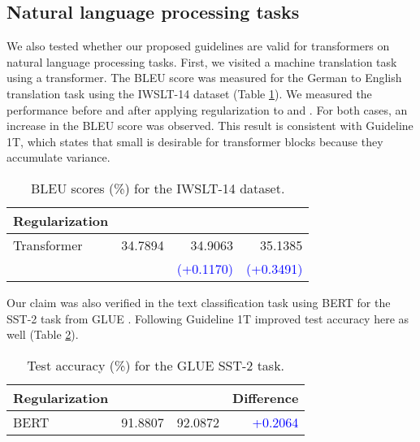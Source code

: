 \documentclass{article}
\begin{document}
\subsection{Natural language processing tasks}
We also tested whether our proposed guidelines are valid for transformers on natural language processing tasks. First, we visited a machine translation task using a transformer. The BLEU score \cite{acl/PapineniRWZ02} was measured for the German to English translation task using the IWSLT-14 dataset \cite{cettolo2014report} (Table \ref{tab:iwslt}). We measured the performance before and after applying  regularization to  and . For both cases, an increase in the BLEU score was observed. This result is consistent with Guideline 1T, which states that small  is desirable for transformer blocks because they accumulate variance.

\begin{table}[h]
	\caption{BLEU scores (\%) for the IWSLT-14 dataset.}
	\label{tab:iwslt}
	\centering
	\begin{tabular}{l|r|r|r}
		\toprule
		 \textbf{Regularization} &  &           &           \\
		\midrule
		Transformer                         & 34.7894   & 34.9063                     & 35.1385                     \\
		                                    &           & \textcolor{blue}{(+0.1170)} & \textcolor{blue}{(+0.3491)} \\
		\bottomrule
	\end{tabular}
\end{table}

Our claim was also verified in the text classification task using BERT for the SST-2 task from GLUE \cite{giclr/WangSMHLB19}. Following Guideline 1T improved test accuracy here as well (Table \ref{tab:sst2}).

\begin{table}[h]
	\caption{Test accuracy (\%) for the GLUE SST-2 task.}
	\label{tab:sst2}
	\centering
	\begin{tabular}{l|r|r|r}
		\toprule
		 \textbf{Regularization} &  &  & \textbf{Difference}       \\
		\midrule
		BERT                                & 91.8807   & 92.0872                     & \textcolor{blue}{+0.2064} \\
		\bottomrule
	\end{tabular}
\end{table}
\end{document}

